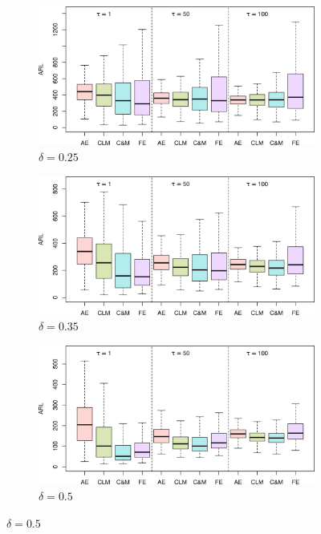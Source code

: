 \begin{figure}
\centering
\begin{subfigure}{0.49\textwidth}
  \centering
  \caption{$ \delta = 0.25$}
  \label{fig:lambda=0.175/theta=4.0/delta=0.25}
  \includegraphics[width=\textwidth]{img/sims/theta=4.0_signedEWMA(l = 0.175, upw = true, L = 1.0)/delta=0.25.png}
\end{subfigure}
\begin{subfigure}{0.49\textwidth}
  \centering
  \caption{$ \delta = 0.35$}
  \label{fig:lambda=0.175/theta=4.0/delta=0.35}
  \includegraphics[width=\textwidth]{img/sims/theta=4.0_signedEWMA(l = 0.175, upw = true, L = 1.0)/delta=0.35.png}
\end{subfigure}
\begin{subfigure}{0.49\textwidth}
  \centering
  \caption{$ \delta = 0.5$}
  \label{fig:lambda=0.175/theta=4.0/delta=0.5}
  \includegraphics[width=\textwidth]{img/sims/theta=4.0_signedEWMA(l = 0.175, upw = true, L = 1.0)/delta=0.50.png}

\end{subfigure}
\end{figure}
